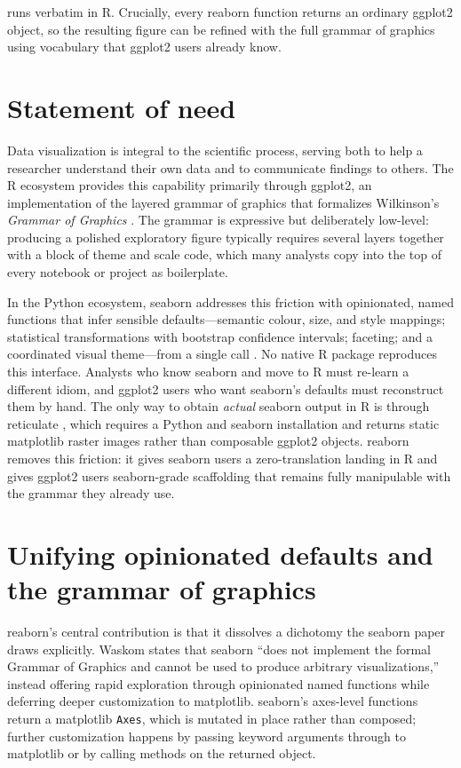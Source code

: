 \documentclass[11pt]{article}
\begin{document}
\noindent runs verbatim in R. Crucially, every reaborn function returns an ordinary
ggplot2 object, so the resulting figure can be refined with the full grammar of
graphics using vocabulary that ggplot2 users already know.

\section{Statement of need}

Data visualization is integral to the scientific process, serving both to help a
researcher understand their own data and to communicate findings to others. The R
ecosystem provides this capability primarily through ggplot2, an implementation of
the layered grammar of graphics \citep{wickham2010layered} that formalizes
Wilkinson's \emph{Grammar of Graphics} \citep{wilkinson2005grammar}. The grammar is
expressive but deliberately low-level: producing a polished exploratory figure
typically requires several layers together with a block of theme and scale code,
which many analysts copy into the top of every notebook or project as boilerplate.

In the Python ecosystem, seaborn addresses this friction with opinionated, named
functions that infer sensible defaults---semantic colour, size, and style mappings;
statistical transformations with bootstrap confidence intervals; faceting; and a
coordinated visual theme---from a single call \citep{waskom2021seaborn}. No native
R package reproduces this interface. Analysts who know seaborn and move to R must
re-learn a different idiom, and ggplot2 users who want seaborn's defaults must
reconstruct them by hand. The only way to obtain \emph{actual} seaborn output in R
is through reticulate \citep{reticulate}, which requires a Python and seaborn
installation and returns static matplotlib raster images rather than composable
ggplot2 objects. reaborn removes this friction: it gives seaborn users a
zero-translation landing in R and gives ggplot2 users seaborn-grade scaffolding that
remains fully manipulable with the grammar they already use.

\section{Unifying opinionated defaults and the grammar of graphics}

reaborn's central contribution is that it dissolves a dichotomy the seaborn paper
draws explicitly. Waskom \citep{waskom2021seaborn} states that seaborn ``does not
implement the formal Grammar of Graphics and cannot be used to produce arbitrary
visualizations,'' instead offering rapid exploration through opinionated named
functions while deferring deeper customization to matplotlib. seaborn's axes-level
functions return a matplotlib \texttt{Axes}, which is mutated in place rather than
composed; further customization happens by passing keyword arguments through to
matplotlib or by calling methods on the returned object.
\end{document}
